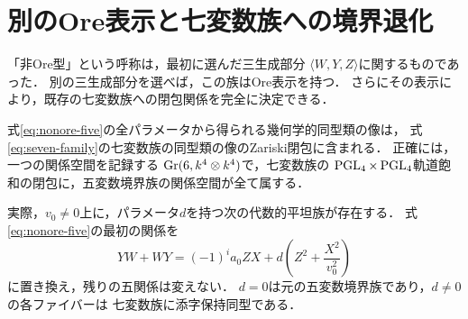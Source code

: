 \section{別のOre表示と七変数族への境界退化}\label{sec:ore-boundary}
「非Ore型」という呼称は，最初に選んだ三生成部分
$\langle W,Y,Z\rangle$に関するものであった．
別の三生成部分を選べば，この族はOre表示を持つ．
さらにその表示により，既存の七変数族への閉包関係を完全に決定できる．

\begin{theorem}[非Ore型二次元族は七変数族の閉包に含まれる]
\label{thm:nonore-in-seven-closure}
式\eqref{eq:nonore-five}の全パラメータから得られる幾何学的同型類の像は，
式\eqref{eq:seven-family}の七変数族の同型類の像のZariski閉包に含まれる．
正確には，一つの関係空間を記録する
$\operatorname{Gr}(6,k^4\otimes k^4)$で，七変数族の
$\operatorname{PGL}_4\times\operatorname{PGL}_4$軌道飽和の閉包に，五変数境界族の関係空間が全て属する．

実際，$v_0\ne0$上に，パラメータ$d$を持つ次の代数的平坦族が存在する．
式\eqref{eq:nonore-five}の最初の関係を
\begin{equation}\label{eq:ore-boundary-family}
 YW+WY=(-1)^i a_0ZX+d\left(Z^2+\frac{X^2}{v_0^2}\right)
\end{equation}
に置き換え，残りの五関係は変えない．
$d=0$は元の五変数境界族であり，$d\ne0$の各ファイバーは
七変数族に添字保持同型である．
\end{theorem}
